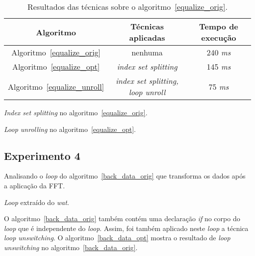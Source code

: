 \begin{table}[H]
  \caption{Resultados das técnicas sobre o algoritmo~\ref{equalize_orig}.}
  \label{tabela_equalize}
\begin{center}
  \begin{tabular}{c|c|c}
    Algoritmo & Técnicas aplicadas & Tempo de execução\\
    \hline
    Algoritmo~\ref{equalize_orig} & nenhuma & 240 \textit{ms} \\
    \hline
    Algoritmo~\ref{equalize_opt} & \textit{index set splitting} & 145 \textit{ms} \\
    \hline
    Algoritmo~\ref{equalize_unroll} & \textit{index set splitting, loop unroll}
                                    & 75 \textit{ms} \\
    \hline
  \end{tabular}
\end{center}
\end{table}



\begin{algorithm}[H]
  \caption{\textit{Index set splitting} no algoritmo~\ref{equalize_orig}.}
\label{equalize_opt}

\end{algorithm}

\begin{algorithm}[H]
  \caption{\textit{Loop unrolling} no algoritmo~\ref{equalize_opt}.}
\label{equalize_unroll}

\end{algorithm}

\subsection{Experimento 4}

Analisando o \textit{loop} do algoritmo~\ref{back_data_orig} que transforma os 
dados após a aplicação da FFT.

\begin{algorithm}[H]
  \caption{\textit{Loop} extraído do \textit{wat}.}
\label{back_data_orig}

\end{algorithm}

O algoritmo~\ref{back_data_orig} também contém uma declaração \textit{if} no corpo do
\textit{loop} que é independente do \textit{loop}. Assim, foi também
aplicado neste \textit{loop} a técnica \textit{loop unswitching}.
O algoritmo~\ref{back_data_opt} mostra o resultado de \textit{loop unswitching} no
algoritmo~\ref{back_data_orig}.

